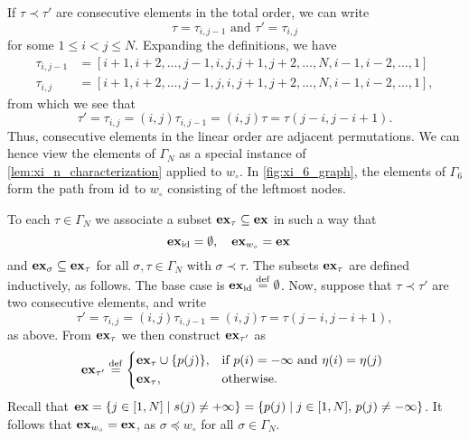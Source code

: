 If $\tau \prec \tau'$ are consecutive elements in the total order, we can write
\begin{equation*}
	\tau = \tau_{i,j-1} \text{ and } \tau' = \tau_{i,j}
\end{equation*}
%
for some $1 \leq i < j \leq N$. Expanding the definitions, we have
\begin{align*}
	\tau_{i, j-1} & = [i+1, i+2, \dots, j - 1, i , j, j+1, j+2, \dots, N, i-1, i-2, \dots, 1] \\
	\tau_{i, j}   & = [i+1, i+2, \dots,j-1,  j, i , j+1, j+2, \dots, N, i-1, i-2, \dots, 1],
\end{align*}
%
from which we see that
\begin{equation*}
	\tau' = \tau_{i,j} = (i, j)\tau_{i, j-1} = (i, j)\tau = \tau(j-i, j-i+1).
\end{equation*}
%
Thus, consecutive elements in the linear order are adjacent permutations. We can hence
view the elements of $\Gamma_N$ as a special instance of
\cref{lem:xi_n_characterization} applied to $w_\circ$. In \cref{fig:xi_6_graph}, the
elements of $\Gamma_6$ form the path from $\operatorname{id}$ to $w_\circ$ consisting of the leftmost
nodes.

To each $\tau \in \Gamma_N$ we associate a subset $\mathbf{ex}_\tau \subseteq \mathbf{ex}$ in such a way that
\begin{equation*}
	\mathbf{ex}_{\operatorname{id}} = \emptyset, \quad \mathbf{ex}_{w_\circ} = \mathbf{ex} \quad
\end{equation*}
%
and $\mathbf{ex}_\sigma \subseteq \mathbf{ex}_\tau$ for all $\sigma, \tau \in \Gamma_N$ with $\sigma
	\prec \tau$. The subsets $\mathbf{ex}_\tau$ are defined inductively, as follows. The base case
is $\mathbf{ex}_{\operatorname{id}} \overset{\mathrm{def}}{=} \emptyset$. Now, suppose that $\tau \prec \tau'$ are two
consecutive elements, and write
\begin{equation*}
	\tau' = \tau_{i,j} = (i, j)\tau_{i, j-1} = (i, j)\tau = \tau(j-i, j-i+1),
\end{equation*}
%
as above. From $\mathbf{ex}_\tau$ we then construct $\mathbf{ex}_{\tau'}$ as
\begin{equation*}
	\ex_{\tau'} \defeq \begin{dcases*}
		\ex_\tau \cup \{p(j)\}, & if $p(i) = -\infty$ and $\eta(i) = \eta(j)$ \\
		\ex_\tau,               & otherwise.
	\end{dcases*}
\end{equation*}
%
Recall that $\mathbf{ex} = \{j \in [1, N] \mid s(j) \neq + \infty \} = \{p(j) \mid j \in [1,
		N],\, p(j) \neq -\infty\}$. It follows that $\mathbf{ex}_{w_\circ} = \mathbf{ex}$, as $\sigma \preceq
	w_\circ$ for all $\sigma\in \Gamma_N$.

